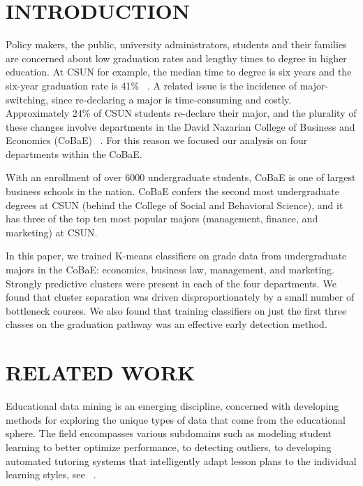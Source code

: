 \documentclass{sigchi}
\begin{document}



\section{INTRODUCTION}

Policy makers, the public, university administrators, students and their families are concerned about low graduation rates and lengthy times to degree in higher education. At CSUN for example, the median time to degree is six years and the six-year graduation rate is 41\% ~\cite{csun1}. A related issue is the incidence of major-switching, since re-declaring a major is time-consuming and costly. Approximately 24\% of CSUN students re-declare their major, and the plurality of these changes involve departments in the David Nazarian College of Business and Economics (CoBaE) ~\cite{csun2}. For this reason we focused our analysis on four departments within the CoBaE.

With an enrollment of over 6000 undergraduate students, CoBaE is one of largest business schools in the nation. CoBaE confers the second most undergraduate degrees at CSUN (behind the College of Social and Behavioral Science), and it has three of the top ten most popular majors (management, finance, and marketing) at CSUN. 

In this paper, we trained K-means classifiers on grade data from undergraduate majors in the CoBaE: economics, business law, management, and marketing. Strongly predictive clusters were present in each of the four departments. We found that cluster separation was driven disproportionately by a small number of bottleneck courses. We also found that training classifiers on just the first three classes on the graduation pathway was an effective early detection method. 









\section{RELATED WORK}

Educational data mining is an emerging discipline, concerned with developing methods for exploring the unique types of data that come from the educational sphere. The field encompasses various subdomains such as modeling student learning to better optimize performance, to detecting outliers, to developing automated tutoring systems that intelligently adapt lesson plans to the individual learning styles, see ~\cite{romero2010educational}. 
\end{document}
